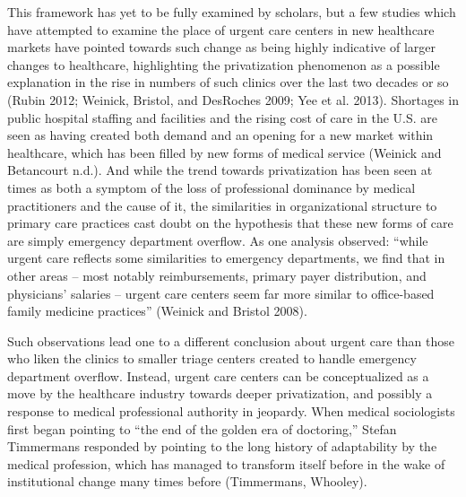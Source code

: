 \documentclass[12pt,twoside]{reedthesis}
\begin{document}
  This framework has yet to be fully examined by scholars, but a few
  studies which have attempted to examine the place of urgent care centers
  in new healthcare markets have pointed towards such change as being
  highly indicative of larger changes to healthcare, highlighting the
  privatization phenomenon as a possible explanation in the rise in
  numbers of such clinics over the last two decades or so (Rubin 2012;
  Weinick, Bristol, and DesRoches 2009; Yee et al. 2013). Shortages in
  public hospital staffing and facilities and the rising cost of care in
  the U.S. are seen as having created both demand and an opening for a new
  market within healthcare, which has been filled by new forms of medical
  service (Weinick and Betancourt n.d.). And while the trend towards
  privatization has been seen at times as both a symptom of the loss of
  professional dominance by medical practitioners and the cause of it, the
  similarities in organizational structure to primary care practices cast
  doubt on the hypothesis that these new forms of care are simply
  emergency department overflow. As one analysis observed: ``while urgent
  care reflects some similarities to emergency departments, we find that
  in other areas -- most notably reimbursements, primary payer
  distribution, and physicians' salaries -- urgent care centers seem far
  more similar to office-based family medicine practices'' (Weinick and
  Bristol 2008).
  
  Such observations lead one to a different conclusion about urgent care
  than those who liken the clinics to smaller triage centers created to
  handle emergency department overflow. Instead, urgent care centers can
  be conceptualized as a move by the healthcare industry towards deeper
  privatization, and possibly a response to medical professional authority
  in jeopardy. When medical sociologists first began pointing to ``the end
  of the golden era of doctoring,'' Stefan Timmermans responded by
  pointing to the long history of adaptability by the medical profession,
  which has managed to transform itself before in the wake of
  institutional change many times before (Timmermans, Whooley).
  
\end{document}

